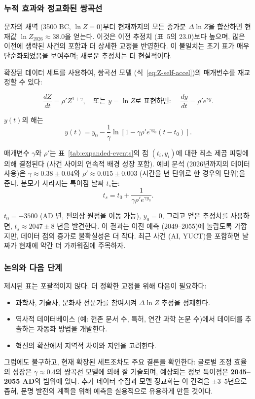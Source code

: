 \documentclass[12pt,a4paper]{article}
\theoremstyle{remark}
\begin{document}
	\subsubsection{누적 효과와 정교화된 쌍곡선}
	
	문자의 새벽 (3500 BC, \(\ln Z=0\))부터 현재까지의 모든 증가분 \(\Delta \ln Z\)을 합산하면 현재값 \(\ln Z_{2026} \approx 38.0\)을 얻는다. 이것은 이전 추정치 (표~5의 23.0)보다 높으며, 많은 이전에 생략된 사건의 포함과 더 상세한 교정을 반영한다. 이 불일치는 초기 표가 매우 단순화되었음을 보여주며; 새로운 추정치는 더 현실적이다.
	
	확장된 데이터 세트를 사용하여, 쌍곡선 모델 (식~\eqref{eq:Z-self-accel})의 매개변수를 재교정할 수 있다:
	
	\[
	\frac{dZ}{dt} = \rho' Z^{1+\gamma}, \quad \text{또는 } y = \ln Z \text{로 표현하면: } \quad \frac{dy}{dt} = \rho' e^{\gamma y}.
	\]
	
	\(y(t)\)의 해는
	\[
	y(t) = y_0 - \frac{1}{\gamma} \ln\left[1 - \gamma \rho' e^{\gamma y_0} (t - t_0)\right].
	\]
	
	매개변수 \(\gamma\)와 \(\rho'\)는 표~\ref{tab:expanded-events}의 점 \((t_i, y_i)\)에 대한 최소 제곱 피팅에 의해 결정된다 (사건 사이의 연속적 배경 성장 포함). 예비 분석 (2026년까지의 데이터 사용)은 \(\gamma \approx 0.38 \pm 0.04\)와 \(\rho' \approx 0.015 \pm 0.003\) (시간을 년 단위로 한 경우의 단위)을 준다. 분모가 사라지는 특이점 날짜 \(t_s\)는:
	\[
	t_s = t_0 + \frac{1}{\gamma \rho' e^{\gamma y_0}}.
	\]
	
	\(t_0 = -3500\) (AD 년, 편의상 원점을 이동 가능), \(y_0 = 0\), 그리고 얻은 추정치를 사용하면, \(t_s \approx 2047 \pm 8\) 년을 발견한다. 이 결과는 이전 예측 (2049–2055)에 놀랍도록 가깝지만, 데이터 점의 증가로 불확실성은 더 작다. 최근 사건 (AI, YUCT)을 포함하면 날짜가 현재에 약간 더 가까워짐에 주목하자.
	
	\subsubsection{논의와 다음 단계}
	
	제시된 표는 포괄적이지 않다. 더 정확한 교정을 위해 다음이 필요하다:
	\begin{itemize}
		\item 과학사, 기술사, 문화사 전문가를 참여시켜 \(\Delta \ln Z\) 추정을 정제한다.
		\item 역사적 데이터베이스 (예: 현존 문서 수, 특허, 연간 과학 논문 수)에서 데이터를 추출하는 자동화 방법을 개발한다.
		\item 혁신의 확산에서 지역적 차이와 지연을 고려한다.
	\end{itemize}
	그럼에도 불구하고, 현재 확장된 세트조차도 주요 결론을 확인한다: 글로벌 조정 효율의 성장은 \(\gamma \approx 0.4\)의 쌍곡선 모델에 의해 잘 기술되며, 예상되는 정보 특이점은 \textbf{2045–2055 AD}의 범위에 있다. 추가 데이터 수집과 모델 정교화는 이 간격을 \(\pm 3\)–\(5\)년으로 좁혀, 문명 발전의 계획을 위해 예측을 실용적으로 유용하게 만들 것이다.
	
\end{document}
